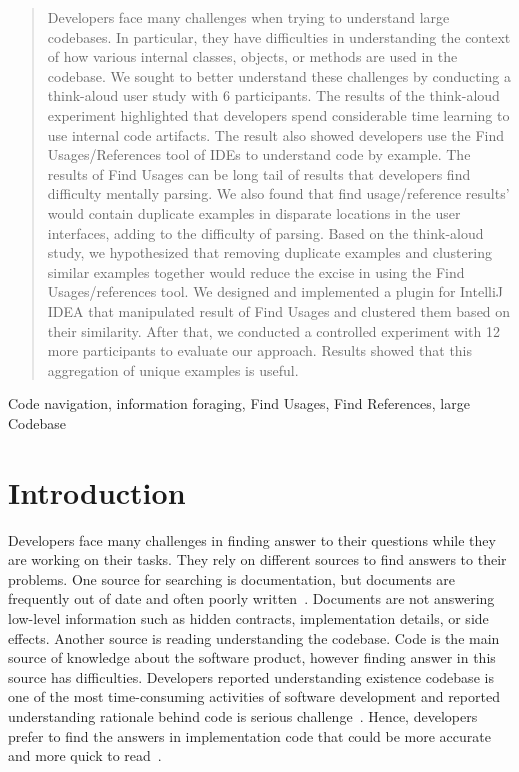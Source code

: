 \documentclass[conference]{IEEEtran}
\begin{document}
\begin{abstract}
Developers face many challenges when trying to understand large codebases. In particular, they have difficulties in understanding the context of how various internal classes, objects, or methods are used in the codebase. We sought to better understand these challenges by conducting a think-aloud user study with 6 participants. The results of the think-aloud experiment highlighted that developers spend considerable time learning to use internal code artifacts. The result also showed developers use the Find Usages/References tool of IDEs to understand code by example. The results of Find Usages can be long tail of results that developers find difficulty mentally parsing. We also found that find usage/reference results' would contain duplicate examples in disparate locations in the user interfaces, adding to the difficulty of parsing. Based on the think-aloud study, we hypothesized that removing duplicate examples and clustering similar examples together would reduce the excise in using the Find Usages/references tool. We designed and implemented a plugin for IntelliJ IDEA that manipulated result of Find Usages and clustered them based on their similarity. After that, we conducted a controlled experiment with 12 more participants to evaluate our approach. Results showed that this aggregation of unique examples is useful.
\end{abstract}

\begin{IEEEkeywords}
Code navigation, information foraging, Find Usages, Find References, large Codebase
\end{IEEEkeywords}


\section{Introduction}

Developers face many challenges in finding answer to their questions while they are working on their tasks. They rely on different sources to find answers to their problems. One source for searching is documentation, but documents are frequently out of date and often poorly written~\cite{documentation}. Documents are not answering low-level information such as hidden contracts, implementation details, or side effects. Another source is reading understanding the codebase. Code is the main source of knowledge about the software product, however finding answer in this source has difficulties. Developers reported understanding existence codebase is one of the most time-consuming activities of software development and reported understanding rationale behind code is serious challenge~\cite{latoza2006maintaining}. Hence, developers prefer to find the answers in implementation code that could be more accurate and more quick to read~\cite{head2018not}.\par
\end{document}

